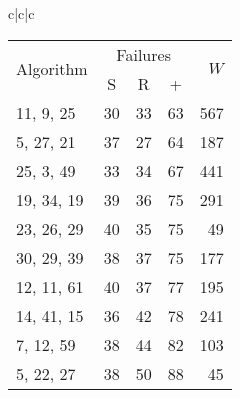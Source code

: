\documentclass{acmsmalltr}
\newcommand{\xst}[3]{#1, #2, #3}
\begin{document}
\begin{sidewaystable}
{\begin{tabular}{c|c|c}
\begin{tabular}{l|rr|r|r}
\multirow{2}{*}{Algorithm} & \multicolumn{3}{c|}{Failures}  & \multirow{2}{*}{$W$}\\
& \multicolumn{1}{c}{S} & \multicolumn{1}{c|}{R} & \multicolumn{1}{c|}{+} \\
\hline
\xst{11}{9}{25} & 30 & 33 & 63 & 567\\
\xst{5}{27}{21} & 37 & 27 & 64 & 187\\
\xst{25}{3}{49} & 33 & 34 & 67 & 441\\
\xst{19}{34}{19} & 39 & 36 & 75 & 291\\
\xst{23}{26}{29} & 40 & 35 & 75 & 49\\
\xst{30}{29}{39} & 38 & 37 & 75 & 177\\
\xst{12}{11}{61} & 40 & 37 & 77 & 195\\
\xst{14}{41}{15} & 36 & 42 & 78 & 241\\
\xst{7}{12}{59} & 38 & 44 & 82 & 103\\
\xst{5}{22}{27} & 38 & 50 & 88 & 45\\
\end{tabular}
\end{tabular}}
\end{sidewaystable}
\end{document}
